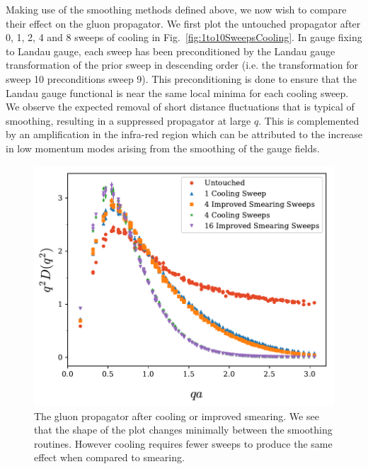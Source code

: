 Making use of the smoothing methods defined above, we now wish to compare their effect on the gluon propagator. We first plot the untouched propagator after 0, 1, 2, 4 and 8 sweeps of cooling in Fig.~\ref{fig:1to10SweepsCooling}. In gauge fixing to Landau gauge, each sweep has been preconditioned by the Landau gauge transformation of the prior sweep in descending order (i.e. the transformation for sweep 10 preconditions sweep 9). This preconditioning is done to ensure that the Landau gauge functional is near the same local minima for each cooling sweep. We observe the expected removal of short distance fluctuations that is typical of smoothing, resulting in a suppressed propagator at large $q$. This is complemented by an amplification in the infra-red region which can be attributed to the increase in low momentum modes arising from the smoothing of the gauge fields.\\
%
\begin{figure}[tb]
\centering
\includegraphics[width=\linewidth]{./ScalarGluComp_q2_SmearCoolComp.pdf}
\caption{\label{fig:SmearCoolComp}The gluon propagator after cooling or improved smearing. We see that the shape of the plot changes minimally between the smoothing routines. However cooling requires fewer sweeps to produce the same effect when compared to smearing.}
\end{figure}
%

